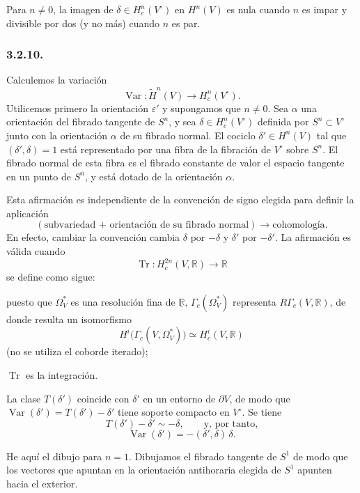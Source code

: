 \pageoriginale

Para $n\ne0$, la imagen de $\delta\in H_c^n(V^\circ)$ en $H^n(V)$
es nula cuando $n$ es impar y divisible por dos (y no más) cuando $n$
es par.

\subsubsection*{3.2.10.}
Calculemos la variación
\[
\operatorname{Var}:\widetilde H^n(V)
\longrightarrow H_c^n(V^\circ).
\]
Utilicemos primero la orientación $\varepsilon'$ y supongamos que
$n\ne0$. Sea $\alpha$ una orientación del fibrado tangente de $S^n$, y
sea $\delta\in H_c^n(V^\circ)$ definida por $S^n\subset V^\circ$ junto
con la orientación $\alpha$ de su fibrado normal. El cociclo
$\delta'\in H^n(V)$ tal que $(\delta',\delta)=1$ está representado por
una fibra de la fibración de $V^\circ$ sobre $S^n$. El fibrado normal de
esta fibra es el fibrado constante de valor el espacio tangente en un
punto de $S^n$, y está dotado de la orientación $\alpha$.

Esta afirmación es independiente de la convención de signo elegida para
definir la aplicación
\[
(\text{subvariedad + orientación de su fibrado normal})
\longrightarrow\text{cohomología}.
\]
En efecto, cambiar la convención cambia $\delta$ por $-\delta$ y
$\delta'$ por $-\delta'$. La afirmación es válida cuando
\[
\operatorname{Tr}:H_c^{2n}(V,\mathbb R)\longrightarrow\mathbb R
\]
se define como sigue:
\begin{description}[leftmargin=2.8em,labelsep=.5em]
\item[\textup{($\alpha$)}] puesto que $\Omega_V^*$ es una resolución
  fina de $\underline{\mathbb R}$, $\Gamma_c(\Omega_V^*)$ representa
  $R\Gamma_c(V,\mathbb R)$, de donde resulta un isomorfismo
  \[
  H^i\bigl(\Gamma_c(V,\Omega_V^*)\bigr)
  \simeq H_c^i(V,\mathbb R)
  \]
  (no se utiliza el coborde iterado);
\item[\textup{($\beta$)}] $\operatorname{Tr}$ es la integración.
\end{description}

La clase $T(\delta')$ coincide con $\delta'$ en un entorno de
$\partial V$, de modo que
$\operatorname{Var}(\delta')=T(\delta')-\delta'$ tiene soporte compacto
en $V^\circ$. Se tiene
\[
T(\delta')-\delta'\sim-\delta,
\qquad\text{y, por tanto,}
\]
\[
\operatorname{Var}(\delta')
=-(\delta',\delta)\,\delta.
\]

He aquí el dibujo para $n=1$. Dibujamos el fibrado tangente de $S^1$
de modo que los vectores que apuntan en la orientación antihoraria
elegida de $S^1$ apunten hacia el exterior.

